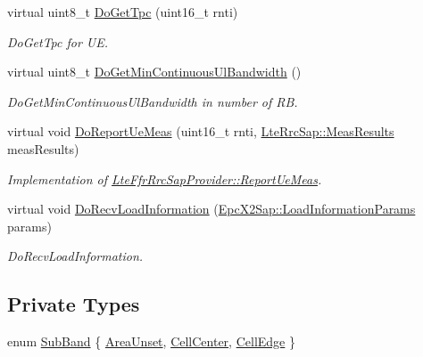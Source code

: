 \begin{DoxyCompactItemize}
virtual uint8\+\_\+t \hyperlink{classns3_1_1LteFrStrictAlgorithm_a15322676b35537aaa84fd272f4ca1346}{Do\+Get\+Tpc} (uint16\+\_\+t rnti)
\begin{DoxyCompactList}\small\item\em Do\+Get\+Tpc for UE. \end{DoxyCompactList}\item 
virtual uint8\+\_\+t \hyperlink{classns3_1_1LteFrStrictAlgorithm_a9647ebc0296e4d4e04a7131b0339af00}{Do\+Get\+Min\+Continuous\+Ul\+Bandwidth} ()
\begin{DoxyCompactList}\small\item\em Do\+Get\+Min\+Continuous\+Ul\+Bandwidth in number of RB. \end{DoxyCompactList}\item 
virtual void \hyperlink{classns3_1_1LteFrStrictAlgorithm_aff1c8467dcf54fd375a7c501ee4a55ca}{Do\+Report\+Ue\+Meas} (uint16\+\_\+t rnti, \hyperlink{structns3_1_1LteRrcSap_1_1MeasResults}{Lte\+Rrc\+Sap\+::\+Meas\+Results} meas\+Results)
\begin{DoxyCompactList}\small\item\em Implementation of \hyperlink{classns3_1_1LteFfrRrcSapProvider_aefa0779641b8432a7d3406b519ca7e59}{Lte\+Ffr\+Rrc\+Sap\+Provider\+::\+Report\+Ue\+Meas}. \end{DoxyCompactList}\item 
virtual void \hyperlink{classns3_1_1LteFrStrictAlgorithm_a22e75da59fc25f24a7bce7d9550dc692}{Do\+Recv\+Load\+Information} (\hyperlink{structns3_1_1EpcX2Sap_1_1LoadInformationParams}{Epc\+X2\+Sap\+::\+Load\+Information\+Params} params)
\begin{DoxyCompactList}\small\item\em Do\+Recv\+Load\+Information. \end{DoxyCompactList}\end{DoxyCompactItemize}
\subsection*{Private Types}
\begin{DoxyCompactItemize}
\item 
enum \hyperlink{classns3_1_1LteFrStrictAlgorithm_a70e144d3c83d78ebf979dbad5d191de7}{Sub\+Band} \{ \hyperlink{classns3_1_1LteFrStrictAlgorithm_a70e144d3c83d78ebf979dbad5d191de7ac01973c3dde31fbd14c1b3e922918f18}{Area\+Unset}, 
\hyperlink{classns3_1_1LteFrStrictAlgorithm_a70e144d3c83d78ebf979dbad5d191de7a7455f21b3eabaeef3ec6aec4b9202dea}{Cell\+Center}, 
\hyperlink{classns3_1_1LteFrStrictAlgorithm_a70e144d3c83d78ebf979dbad5d191de7a263b073dd1aafaf85a35b5cb245b10e6}{Cell\+Edge}
 \}
\end{DoxyCompactItemize}
